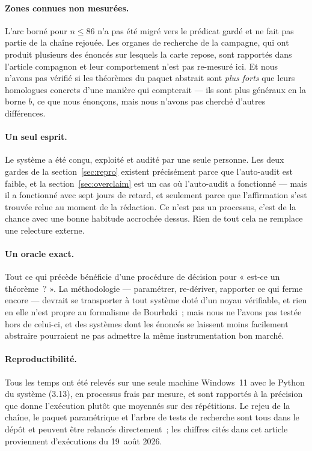\documentclass[11pt]{article}
\theoremstyle{remark}\newtheorem{remarque}{Remarque}
\begin{document}
\paragraph{Zones connues non mesurées.} L'arc borné pour $n \le 86$ n'a pas été migré
vers le prédicat gardé et ne fait pas partie de la chaîne rejouée. Les organes de
recherche de la campagne, qui ont produit plusieurs des énoncés sur lesquels la carte
repose, sont rapportés dans l'article compagnon et leur comportement n'est pas re-mesuré
ici. Et nous n'avons pas vérifié si les théorèmes du paquet abstrait sont \emph{plus
forts} que leurs homologues concrets d'une manière qui compterait --- ils sont plus
généraux en la borne $b$, ce que nous énonçons, mais nous n'avons pas cherché d'autres
différences.

\paragraph{Un seul esprit.} Le système a été conçu, exploité et audité par une seule
personne. Les deux gardes de la section~\ref{sec:repro} existent précisément parce que
l'auto-audit est faible, et la section~\ref{sec:overclaim} est un cas où l'auto-audit a
fonctionné --- mais il a fonctionné avec sept jours de retard, et seulement parce que
l'affirmation s'est trouvée relue au moment de la rédaction. Ce n'est pas un processus,
c'est de la chance avec une bonne habitude accrochée dessus. Rien de tout cela ne
remplace une relecture externe.

\paragraph{Un oracle exact.} Tout ce qui précède bénéficie d'une procédure de décision
pour « est-ce un théorème~? ». La méthodologie --- paramétrer, re-dériver, rapporter ce
qui ferme encore --- devrait se transporter à tout système doté d'un noyau vérifiable, et
rien en elle n'est propre au formalisme de Bourbaki~; mais nous ne l'avons pas testée
hors de celui-ci, et des systèmes dont les énoncés se laissent moins facilement abstraire
pourraient ne pas admettre la même instrumentation bon marché.

\paragraph{Reproductibilité.} Tous les temps ont été relevés sur une seule machine
Windows~11 avec le Python du système (3.13), en processus frais par mesure, et sont
rapportés à la précision que donne l'exécution plutôt que moyennés sur des répétitions.
Le rejeu de la chaîne, le paquet paramétrique et l'arbre de tests de recherche sont tous
dans le dépôt et peuvent être relancés directement~; les chiffres cités dans cet article
proviennent d'exécutions du 19~août 2026.
\end{document}

